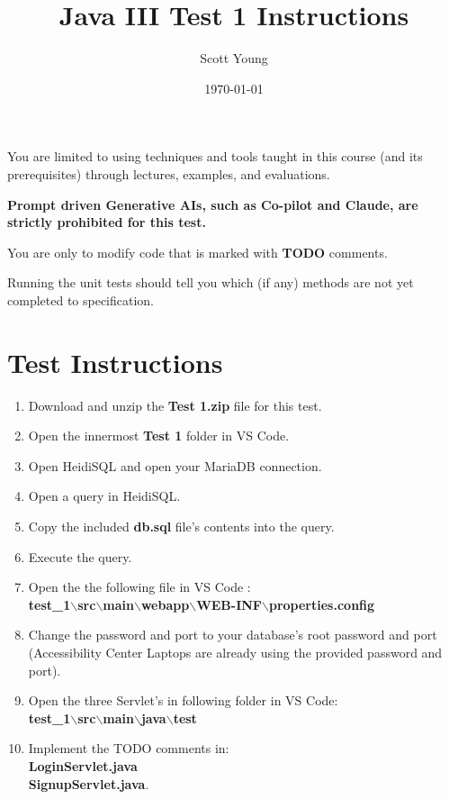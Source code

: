 \documentclass{article}
\title{Java III Test 1 Instructions}
\author{Scott Young}
\date{\today}
\begin{document}
\maketitle

You are limited to using techniques and tools taught in this course
(and its prerequisites) through lectures, examples, and evaluations.

\textbf{Prompt driven Generative AIs, such as Co-pilot and Claude, are strictly prohibited for this test.}

You are only to modify code that is marked with \textbf{TODO} comments.

Running the unit tests should tell you which (if any) methods are not
yet completed to specification.


\section{Test Instructions}
\begin{enumerate}
    \item Download and unzip the \textbf{Test 1.zip} file for this test.
    \item Open the innermost \textbf{Test 1} folder in VS Code.
    \item Open HeidiSQL and open your MariaDB connection.
    \item Open a query in HeidiSQL.
    \item Copy the included \textbf{db.sql} file's contents into the query.
    \item Execute the query.
    \item Open the the following file in VS Code :\\\textbf{test\_1$\backslash$src$\backslash$main$\backslash$webapp$\backslash$WEB-INF$\backslash$properties.config}
    \item Change the password and port to your database's root password and port (Accessibility Center Laptops are already using the provided password and port).
    \item Open the three Servlet's in following folder in VS Code:\\\textbf{test\_1$\backslash$src$\backslash$main$\backslash$java$\backslash$test}
    \item Implement the TODO comments in:\\\textbf{LoginServlet.java}\\\textbf{SignupServlet.java}.
\end{enumerate}
\end{document}
